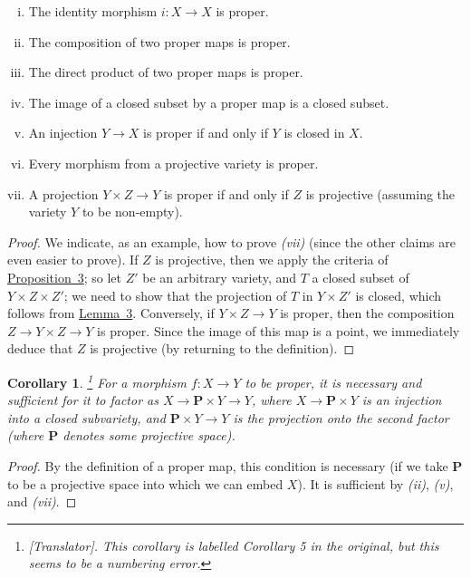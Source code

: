 \documentclass{article}
\theoremstyle{plain}
\newenvironment{proposition}[1]
    {\renewcommand\theinnerproposition{#1}\innerproposition}
    {\endinnerproposition}
\newtheorem*{corollary}{Corollary}
\theoremstyle{definition}
\newcommand{\PP}{\mathbf{P}}
\begin{document}
\begin{proposition}{4}
\label{proposition4}
  \begin{enumerate}[(i)]
    \item The identity morphism $i\colon X\to X$ is proper.
    \item The composition of two proper maps is proper.
    \item The direct product of two proper maps is proper.
    \item The image of a closed subset by a proper map is a closed subset.
    \item An injection $Y\to X$ is proper if and only if $Y$ is closed in $X$.
    \item Every morphism from a projective variety is proper.
    \item A projection $Y\times Z\to Y$ is proper if and only if $Z$ is projective (assuming the variety $Y$ to be non-empty).
  \end{enumerate}
\end{proposition}

\begin{proof}
  We indicate, as an example, how to prove \emph{(vii)} (since the other claims are even easier to prove).
  If $Z$ is projective, then we apply the criteria of \hyperref[proposition3]{Proposition~3};
  so let $Z'$ be an arbitrary variety, and $T$ a closed subset of $Y\times Z\times Z'$;
  we need to show that the projection of $T$ in $Y\times Z'$ is closed, which follows from \hyperref[lemma3]{Lemma~3}.
  Conversely, if $Y\times Z\to Y$ is proper, then the composition $Z\to Y\times Z\to Y$ is proper.
  Since the image of this map is a point, we immediately deduce that $Z$ is projective (by returning to the definition).
\end{proof}

\begin{corollary}
\label{corollary5}
  \footnote{\emph{[Translator]. This corollary is labelled \emph{Corollary 5} in the original, but this seems to be a numbering error.}}
  For a morphism $f\colon X\to Y$ to be proper, it is necessary and sufficient for it to factor as $X\to \PP\times Y\to Y$, where $X\to \PP\times Y$ is an injection into a closed subvariety, and $\PP\times Y\to Y$ is the projection onto the second factor (where $\PP$ denotes some projective space).
\end{corollary}

\begin{proof}
  By the definition of a proper map, this condition is necessary (if we take $\PP$ to be a projective space into which we can embed $X$).
  It is sufficient by \emph{(ii)}, \emph{(v)}, and \emph{(vii)}.
\end{proof}
\end{document}
